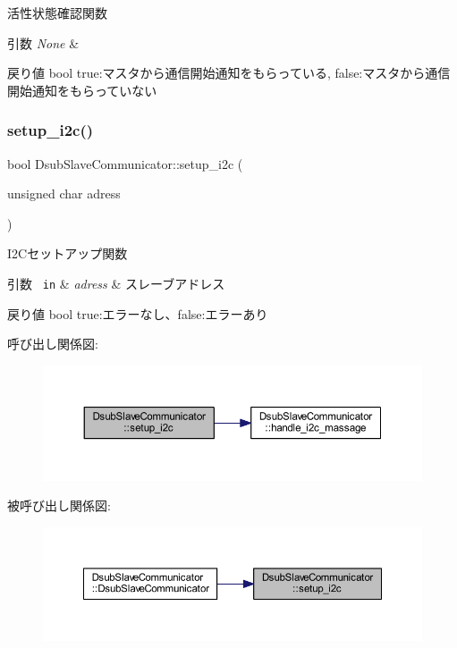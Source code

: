 活性状態確認関数 


\begin{DoxyParams}{引数}
{\em None} & \\
\hline
\end{DoxyParams}
\begin{DoxyReturn}{戻り値}
bool true\+:マスタから通信開始通知をもらっている, false\+:マスタから通信開始通知をもらっていない 
\end{DoxyReturn}
\mbox{\label{class_dsub_slave_communicator_a38614c9732f810200a8429dd4bac88aa}} 
\subsubsection{\texorpdfstring{setup\_i2c()}{setup\_i2c()}}
{\footnotesize\ttfamily bool Dsub\+Slave\+Communicator\+::setup\+\_\+i2c (\begin{DoxyParamCaption}\item[{unsigned char}]{adress }\end{DoxyParamCaption})}



I2\+Cセットアップ関数 


\begin{DoxyParams}[1]{引数}
\mbox{\texttt{ in}}  & {\em adress} & スレーブアドレス \\
\hline
\end{DoxyParams}
\begin{DoxyReturn}{戻り値}
bool true\+:エラーなし、false\+:エラーあり 
\end{DoxyReturn}
呼び出し関係図\+:
\nopagebreak
\begin{figure}[H]
\begin{center}
\leavevmode
\includegraphics[width=350pt]{class_dsub_slave_communicator_a38614c9732f810200a8429dd4bac88aa_cgraph}
\end{center}
\end{figure}
被呼び出し関係図\+:
\nopagebreak
\begin{figure}[H]
\begin{center}
\leavevmode
\includegraphics[width=350pt]{class_dsub_slave_communicator_a38614c9732f810200a8429dd4bac88aa_icgraph}
\end{center}
\end{figure}


